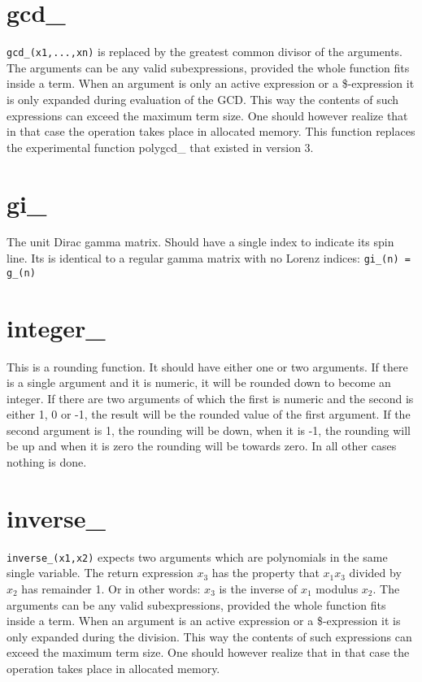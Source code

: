 \section{gcd\_}
\label{fungcd}
\noindent \verb:gcd_(x1,...,xn): is replaced by the greatest common divisor 
of the arguments. The arguments can be any valid subexpressions, provided 
the whole function fits inside a term. When an argument is only an active 
expression or a \$-expression it is only expanded during evaluation of the 
GCD. This way the contents of such expressions can exceed the maximum term 
size. One should however realize that in that case the operation takes 
place in allocated memory.
This function replaces the experimental function 
polygcd\_ that existed in 
version 3.


\section{gi\_}
\label{fungi}
\noindent The unit Dirac gamma matrix. Should have a single index 
to indicate its spin line. Its is identical to a regular gamma matrix with 
no Lorenz indices: \verb:gi_(n) = g_(n):


\section{integer\_}
\label{funinteger}
\noindent This is a rounding function. It should have 
either one or two arguments. If there is a single argument and it is 
numeric, it will be rounded down to become an integer. If there are two 
arguments of which the first is numeric and the second is either 1, 0 or 
-1, the result will be the rounded value of the first argument. If the 
second argument is 1, the rounding will be down, when it is -1, the 
rounding will be up and when it is zero the rounding will be towards zero. 
In all other cases nothing is done.


\section{inverse\_}
\label{funinverse}
\noindent \verb:inverse_(x1,x2): expects two arguments which are 
polynomials in the same single variable. The return expression $x_3$ 
has the property that $x_1 x_3$ divided by $x_2$ has remainder 1. Or in 
other words: $x_3$ is the inverse of $x_1$ modulus $x_2$.
The arguments can be any valid subexpressions, provided the whole function 
fits inside a term. When an argument is an active expression or a 
\$-expression it is only expanded during the division. This way the 
contents of such expressions can exceed the maximum term size. One should 
however realize that in that case the operation takes place in allocated 
memory. 

